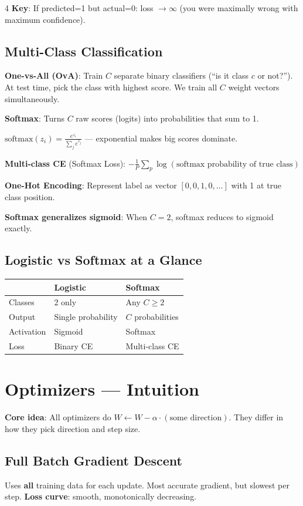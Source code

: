 \documentclass[6pt,landscape,a4paper]{extarticle}
\begin{document}
\begin{multicols}{4}
\textbf{Key}: If predicted=1 but actual=0: loss $\to \infty$ (you were maximally wrong with maximum confidence).

\subsection{Multi-Class Classification}
\textbf{One-vs-All (OvA)}: Train $C$ separate binary classifiers (``is it class $c$ or not?''). At test time, pick the class with highest score. We train all $C$ weight vectors simultaneously.

\textbf{Softmax}: Turns $C$ raw scores (logits) into probabilities that sum to 1.

$\text{softmax}(z_i) = \frac{e^{z_i}}{\sum_j e^{z_j}}$ --- exponential makes big scores dominate.

\textbf{Multi-class CE} (Softmax Loss): $-\frac{1}{P}\sum_p \log(\text{softmax probability of true class})$

\textbf{One-Hot Encoding}: Represent label as vector $[0,0,1,0,\ldots]$ with 1 at true class position.

\textbf{Softmax generalizes sigmoid}: When $C=2$, softmax reduces to sigmoid exactly.

\subsection{Logistic vs Softmax at a Glance}
\begin{tabular}{@{}l|l|l@{}}
& \textbf{Logistic} & \textbf{Softmax} \\\hline
Classes & 2 only & Any $C\ge2$ \\
Output & Single probability & $C$ probabilities \\
Activation & Sigmoid & Softmax \\
Loss & Binary CE & Multi-class CE \\
\end{tabular}

\section{Optimizers --- Intuition}

\textbf{Core idea}: All optimizers do $W \leftarrow W - \alpha \cdot (\text{some direction})$. They differ in how they pick direction and step size.

\subsection{Full Batch Gradient Descent}
Uses \textbf{all} training data for each update. Most accurate gradient, but slowest per step. \textbf{Loss curve}: smooth, monotonically decreasing.


\end{multicols}
\end{document}
